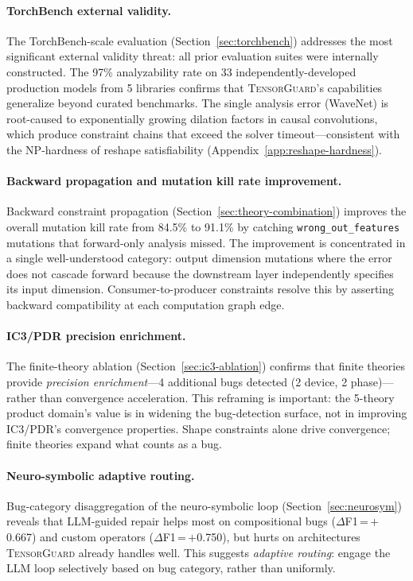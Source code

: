 \documentclass[11pt]{article}
\begin{document}
\paragraph{TorchBench external validity.}
The TorchBench-scale evaluation (Section~\ref{sec:torchbench}) addresses
the most significant external validity threat: all prior evaluation
suites were internally constructed.  The 97\% analyzability rate on
33 independently-developed production models from 5 libraries confirms
that \textsc{TensorGuard}'s capabilities generalize beyond curated
benchmarks.  The single analysis error (WaveNet) is root-caused to
exponentially growing dilation factors in causal convolutions, which
produce constraint chains that exceed the solver timeout---consistent
with the NP-hardness of reshape satisfiability
(Appendix~\ref{app:reshape-hardness}).

\paragraph{Backward propagation and mutation kill rate improvement.}
Backward constraint propagation
(Section~\ref{sec:theory-combination}) improves the overall mutation
kill rate from 84.5\% to 91.1\% by catching \texttt{wrong\_out\_features}
mutations that forward-only analysis missed.  The improvement is
concentrated in a single well-understood category: output dimension
mutations where the error does not cascade forward because the
downstream layer independently specifies its input dimension.
Consumer-to-producer constraints resolve this by asserting backward
compatibility at each computation graph edge.

\paragraph{IC3/PDR precision enrichment.}
The finite-theory ablation (Section~\ref{sec:ic3-ablation}) confirms that
finite theories provide \emph{precision enrichment}---4 additional bugs
detected (2 device, 2 phase)---rather than convergence acceleration.
This reframing is important: the 5-theory product domain's value is
in widening the bug-detection surface, not in improving IC3/PDR's
convergence properties.  Shape constraints alone drive convergence;
finite theories expand what counts as a bug.

\paragraph{Neuro-symbolic adaptive routing.}
Bug-category disaggregation of the neuro-symbolic loop
(Section~\ref{sec:neurosym}) reveals that LLM-guided repair helps most
on compositional bugs ($\Delta$F1\,=\,$+$0.667) and custom operators
($\Delta$F1\,=\,$+$0.750), but hurts on architectures
\textsc{TensorGuard} already handles well.  This suggests
\emph{adaptive routing}: engage the LLM loop selectively based on
bug category, rather than uniformly.
\end{document}
